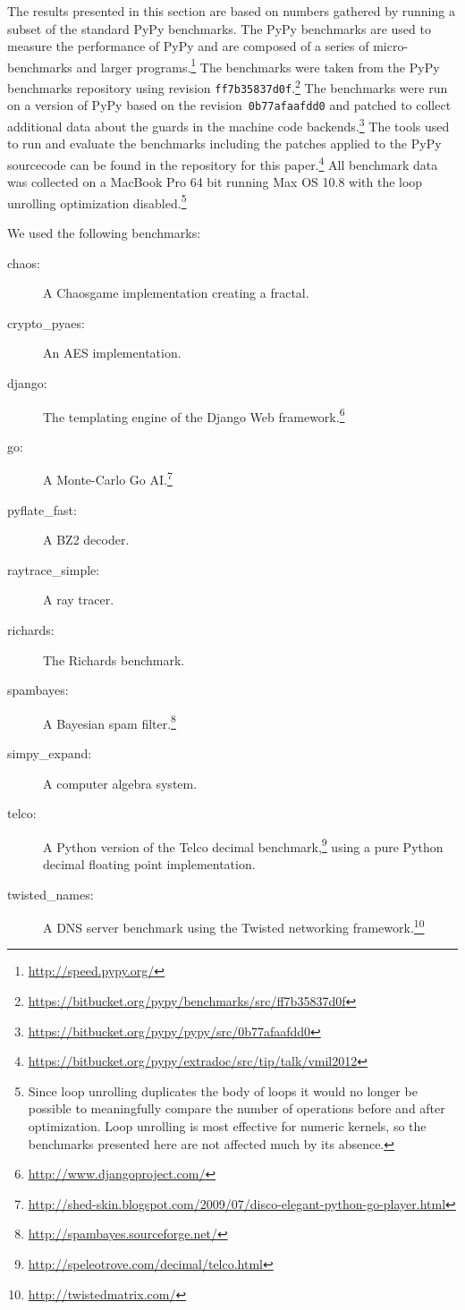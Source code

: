 \documentclass[10pt,preprint]{sigplanconf}
\begin{document}
The results presented in this section are based on numbers gathered by running
a subset of the standard PyPy benchmarks. The PyPy benchmarks are used to
measure the performance of PyPy and are composed of a series of
micro-benchmarks and larger programs.\footnote{\url{http://speed.pypy.org/}} The
benchmarks were taken from the PyPy benchmarks repository using revision
\texttt{ff7b35837d0f}.\footnote{\url{https://bitbucket.org/pypy/benchmarks/src/ff7b35837d0f}}
The benchmarks were run on a version of PyPy based on the
revision~\texttt{0b77afaafdd0} and patched to collect additional data about the
guards in the machine code
backends.\footnote{\url{https://bitbucket.org/pypy/pypy/src/0b77afaafdd0}} The
tools used to run and evaluate the benchmarks including the patches applied to
the PyPy sourcecode can be found in the repository for this
paper.\footnote{\url{https://bitbucket.org/pypy/extradoc/src/tip/talk/vmil2012}}
All
benchmark data was collected on a MacBook Pro 64 bit running Max OS 10.8 with
the loop unrolling optimization disabled.\footnote{Since loop unrolling
duplicates the body of loops it would no longer be possible to meaningfully
compare the number of operations before and after optimization. Loop unrolling
is most effective for numeric kernels, so the benchmarks presented here are not
affected much by its absence.}

We used the following benchmarks:

\begin{description}
    \item[chaos:] A Chaosgame implementation creating a fractal.
    \item[crypto\_pyaes:] An AES implementation.
    \item[django:] The templating engine of the Django Web
        framework.\footnote{\url{http://www.djangoproject.com/}}

    \item[go:] A Monte-Carlo Go
        AI.\footnote{\url{http://shed-skin.blogspot.com/2009/07/disco-elegant-python-go-player.html}}
    \item[pyflate\_fast:] A BZ2 decoder.
    \item[raytrace\_simple:] A ray tracer.
    \item[richards:] The Richards benchmark.
    \item[spambayes:] A Bayesian spam filter.\footnote{\url{http://spambayes.sourceforge.net/}}
    \item[simpy\_expand:] A computer algebra system.
    \item[telco:] A Python version of the Telco decimal
        benchmark,\footnote{\url{http://speleotrove.com/decimal/telco.html}}
        using a pure Python decimal floating point implementation.
    \item[twisted\_names:] A DNS server benchmark using the Twisted networking
        framework.\footnote{\url{http://twistedmatrix.com/}}
\end{description}
\end{document}
